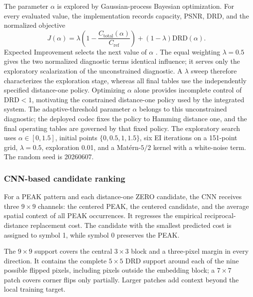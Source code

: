 \documentclass[a4paper,fleqn]{cas-dc}
\newcommand{\RevisionAddBegin}{\begingroup}
\newcommand{\RevisionAddEnd}{\endgroup}
\newcommand{\RevisionAddBegin}{\begingroup\color{revisionblue}}
\newcommand{\RevisionAddEnd}{\endgroup}
\begin{document}
The parameter $\alpha$ is explored by Gaussian-process Bayesian optimization.
For every evaluated value, the implementation records capacity, PSNR, DRD, and
the normalized objective
\begin{equation}
J(\alpha)=\lambda\left(1-\frac{C_{\text{total}}(\alpha)}{C_{\mathrm{ref}}}\right)
+(1-\lambda)\mathrm{DRD}(\alpha).
\label{eq:gp-objective}
\end{equation}
Expected Improvement selects the next value of $\alpha$
\cite{Frazier2018Bayesian}. The equal weighting
$\lambda=0.5$ gives the two normalized diagnostic terms identical influence;
\RevisionAddBegin
it serves only the exploratory scalarization of the unconstrained diagnostic.
A $\lambda$ sweep therefore characterizes the exploration stage, whereas all
final tables use the independently specified distance-one policy. Optimizing
$\alpha$ alone provides incomplete control of
\RevisionAddEnd
$\mathrm{DRD}<1$, motivating the constrained distance-one policy used by the
\RevisionAddBegin
integrated system. The adaptive-threshold parameter $\alpha$ belongs to this
unconstrained diagnostic; the deployed codec fixes the policy to Hamming
distance one, and the final operating tables are governed by that fixed policy.
The exploratory search uses
\RevisionAddEnd
$\alpha\in[0,1.5]$, initial points $\{0,0.5,1,1.5\}$, six EI iterations on a
\RevisionAddBegin
151-point grid, $\lambda=0.5$, exploration 0.01, and a Mat\'ern-$5/2$ kernel
\RevisionAddEnd
with a white-noise term. The random seed is 20260607.

\subsubsection*{CNN-based candidate ranking}

For a PEAK pattern and each distance-one ZERO candidate, the CNN receives three
\RevisionAddBegin
$9\times9$ channels: the centered PEAK, the centered candidate, and the average
\RevisionAddEnd
spatial context of all PEAK occurrences. It regresses the empirical
reciprocal-distance replacement cost. The candidate with the smallest predicted
\RevisionAddBegin
cost is assigned to symbol 1, while symbol 0 preserves the PEAK.
\RevisionAddEnd

The $9\times9$ support covers the central $3\times3$ block and a three-pixel
margin in every direction. It contains the complete $5\times5$ DRD support
around each of the nine possible flipped pixels, including pixels outside the
\RevisionAddBegin
embedding block; a $7\times7$ patch covers corner flips only partially.
Larger patches add context beyond the local training target.
\RevisionAddEnd
\end{document}
